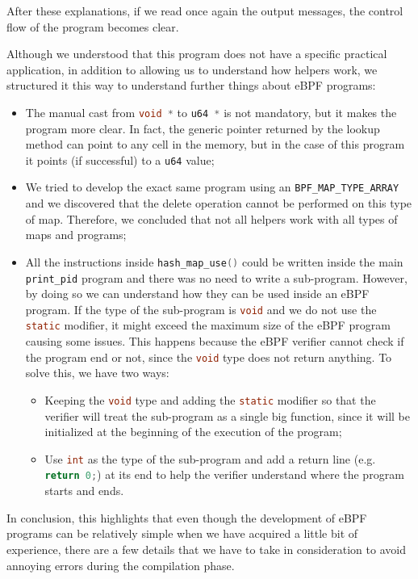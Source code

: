 After these explanations, if we read once again the output messages, the control flow of the program becomes clear.

Although we understood that this program does not have a specific practical application, in addition to allowing us to understand how helpers work, we structured it this way to understand further things about eBPF programs:

\begin{itemize}
	\item 
		The manual cast from \colorbox{backcolour}{\lstinline[style=cstyle, language=C]|void *|} to \colorbox{backcolour}{\lstinline[style=cstyle, language=C]|u64 *|} is not mandatory, but it makes the program more clear.
		In fact, the generic pointer returned by the lookup method can point to any cell in the memory, but in the case of this program it points (if successful) to a \colorbox{backcolour}{\lstinline[style=cstyle, language=C]|u64|} value;
	\item 
		We tried to develop the exact same program using an \colorbox{backcolour}{\lstinline[style=highlight, language=bash]|BPF_MAP_TYPE_ARRAY|} and we discovered that the delete operation cannot be performed on this type of map.
		Therefore, we concluded that not all helpers work with all types of maps and programs;
	\item 
		All the instructions inside \colorbox{backcolour}{\lstinline[style=cstyle, language=C]|hash_map_use()|} could be written inside the main \colorbox{backcolour}{\lstinline[style=cstyle, language=C]|print_pid|} program and there was no need to write a sub-program.
		However, by doing so we can understand how they can be used inside an eBPF program.
		If the type of the sub-program is \colorbox{backcolour}{\lstinline[style=cstyle, language=C]|void|} and we do not use the \colorbox{backcolour}{\lstinline[style=cstyle, language=C]|static|} modifier, it might exceed the maximum size of the eBPF program causing some issues.
		This happens because the eBPF verifier cannot check if the program end or not, since the \colorbox{backcolour}{\lstinline[style=cstyle, language=C]|void|} type does not return anything.
		To solve this, we have two ways:
		\begin{itemize}
			\item 
				Keeping the \colorbox{backcolour}{\lstinline[style=cstyle, language=C]|void|} type and adding the \colorbox{backcolour}{\lstinline[style=cstyle, language=C]|static|} modifier so that the verifier will treat the sub-program as a single big function, since it will be initialized at the beginning of the execution of the program;
			\item 
				Use \colorbox{backcolour}{\lstinline[style=cstyle, language=C]|int|} as the type of the sub-program and add a return line (e.g. \colorbox{backcolour}{\lstinline[style=cstyle, language=C]|return 0;|}) at its end to help the verifier understand where the program starts and ends.
		\end{itemize}
\end{itemize}

In conclusion, this highlights that even though the development of eBPF programs can be relatively simple when we have acquired a little bit of experience, there are a few details that we have to take in consideration to avoid annoying errors during the compilation phase.